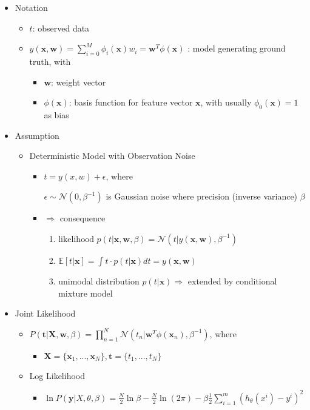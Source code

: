 \begin{itemize}

\item Notation
	\begin{itemize}
	\item $t$: observed data
	\item $\displaystyle y(\mathbf x,\mathbf w)=\sum_{i=0}^{M}\phi_i(\mathbf x)w_i = \mathbf w^T \phi(\mathbf x)$ : model generating ground truth, with
		\begin{itemize}
		\item $\mathbf w$: weight vector
		\item $\phi(\mathbf x)$: basis function for feature vector $\mathbf x$, with usually $\phi_0(\mathbf x) = 1$ as bias
		\end{itemize}
	\end{itemize}

\item Assumption
	\begin{itemize}
	\item Deterministic Model with Observation Noise
		\begin{itemize}
		\item \(t=y(x,w)+\epsilon\), where
		
		$\epsilon \sim \mathcal N(0,\beta^{-1})$ is Gaussian noise where precision (inverse variance) $\beta$
		\item $\Rightarrow$ consequence
			\begin{enumerate}
			\item $\text{likelihood } p(t|\mathbf x,\mathbf w,\beta) = \mathcal N(t|y(\mathbf x,\mathbf w), \beta^{-1})$
			\item $\mathbb E[t|\mathbf x] = \int t\cdot p(t|\mathbf x) dt = y(\mathbf x, \mathbf w) $
			\item unimodal distribution $p(t|\mathbf x) \Rightarrow$ extended by conditional mixture model
			\end{enumerate}

		\end{itemize}
	\end{itemize}

\item Joint Likelihood

	\begin{itemize}
	\item $\displaystyle P(\mathbf t|\mathbf X,\mathbf w,\beta) = \prod_{n=1}^N \mathcal N(t_n|\mathbf w ^T\phi(\mathbf x_n), \beta^{-1})$, where
		\begin{itemize}
		\item $\mathbf X = \{ \mathbf x_1,...,\mathbf x_N \}, \mathbf t = \{ t_1,...,t_N \}$
		\end{itemize}
	\item Log Likelihood 
		\begin{itemize}
			\item $\displaystyle \ln P(\boldsymbol y|X,\theta,\beta) = \frac N 2\ln\beta - \frac N 2 \ln(2\pi) - \beta \frac 1 2\sum_{i=1}^m (h_\theta(x^i) - y^i)^2$
		\end{itemize}
	 

\end{itemize}
\end{itemize}

